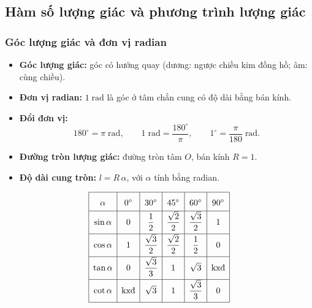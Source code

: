 \documentclass[12pt,a4paper]{article}
\begin{document}
\subsection{Hàm số lượng giác và phương trình lượng giác}

\subsubsection{Góc lượng giác và đơn vị radian}

\begin{dinhnghia}
  \begin{itemize}
    \item \textbf{Góc lượng giác:} góc có hướng quay (dương: ngược chiều kim đồng hồ; âm: cùng chiều).
    \item \textbf{Đơn vị radian:} $1\;\text{rad}$ là góc ở tâm chắn cung có độ dài bằng bán kính.
    \item \textbf{Đổi đơn vị:}
      \[
        180^\circ = \pi\;\text{rad},\qquad
        1\;\text{rad} = \frac{180^\circ}{\pi},\qquad
        1^\circ = \frac{\pi}{180}\;\text{rad}.
      \]
    \item \textbf{Đường tròn lượng giác:} đường tròn tâm $O$, bán kính $R = 1$.
    \item \textbf{Độ dài cung tròn:} $l = R\,\alpha$, với $\alpha$ tính bằng radian.
  \end{itemize}
\end{dinhnghia}

\begin{congthuc}[title={Bảng giá trị lượng giác đặc biệt}]
  \[
    \renewcommand{\arraystretch}{1.8}
    \begin{array}{|c|c|c|c|c|c|}
      \hline
      \alpha & 0^\circ & 30^\circ & 45^\circ & 60^\circ & 90^\circ \\
      \hline
      \sin\alpha & 0 & \dfrac{1}{2} & \dfrac{\sqrt{2}}{2} & \dfrac{\sqrt{3}}{2} & 1 \\[4pt]
      \hline
      \cos\alpha & 1 & \dfrac{\sqrt{3}}{2} & \dfrac{\sqrt{2}}{2} & \dfrac{1}{2} & 0 \\[4pt]
      \hline
      \tan\alpha & 0 & \dfrac{\sqrt{3}}{3} & 1 & \sqrt{3} & \text{kxđ} \\[4pt]
      \hline
      \cot\alpha & \text{kxđ} & \sqrt{3} & 1 & \dfrac{\sqrt{3}}{3} & 0 \\[4pt]
      \hline
    \end{array}
  \]
\end{congthuc}
\end{document}
